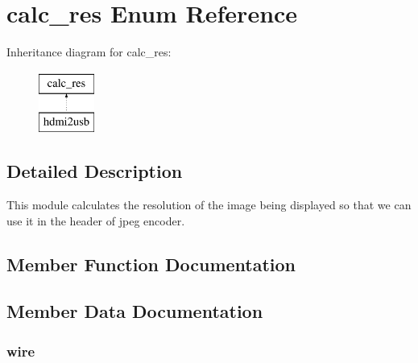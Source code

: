\section{calc\-\_\-res Enum Reference}
\label{enum1calc__res}
Inheritance diagram for calc\-\_\-res\-:\begin{figure}[H]
\begin{center}
\leavevmode
\includegraphics[height=2.000000cm]{enum1calc__res}
\end{center}
\end{figure}


\subsection{Detailed Description}
This module calculates the resolution of the image being displayed so that we can use it in the header of jpeg encoder. 

\subsection{Member Function Documentation}
\subsubsection[{P\-R\-O\-C\-E\-S\-S\-\_\-0}]{\setlength{\rightskip}{0pt plus 5cm}\hspace{0.3cm}}\label{enum1calc__res_a7fff6d728c52bd4a08f47ca610229209}


\subsection{Member Data Documentation}
\subsubsection[{rst\-\_\-n}]{ {\bfseries \textcolor{vhdlchar}{wire}\textcolor{vhdlchar}{ }} \hspace{0.3cm}}\label{enum1calc__res_a8d860e9434303aa4ada705bc66f817a2}
